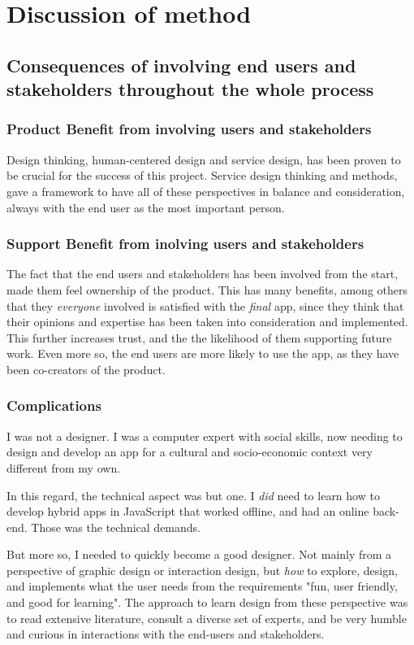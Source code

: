 \section{Discussion of method}

\subsection{Consequences of involving end users and stakeholders throughout the whole process}

\subsubsection{Product Benefit from involving users and stakeholders}
Design thinking, human-centered design and service design, has been proven to be crucial for the success of this project. Service design thinking and methods, gave a framework to have all of these perspectives in balance and consideration, always with the end user as the most important person.

\subsubsection{Support Benefit from inolving users and stakeholders}
The fact that the end users and stakeholders has been involved from the start, made them feel ownership of the product. This has many benefits, among others that they \textit{everyone} involved is satisfied with the \textit{final} app, since they think that their opinions and expertise has been taken into consideration and implemented. This further increases trust, and the the likelihood of them supporting future work. Even more so, the end users are more likely to use the app, as they have been co-creators of the product.

\subsubsection{Complications}
I was not a designer. I was a computer expert with social skills, now needing to design and develop an app for a cultural and socio-economic context very different from my own.

In this regard, the technical aspect was but one. I \textit{did} need to learn how to develop hybrid apps in JavaScript that worked offline, and had an online back-end. Those was the technical demands.

But more so, I needed to quickly become a good designer. Not mainly from a perspective of graphic design or interaction design, but \textit{how} to explore, design, and implements what the user needs from the requirements "fun, user friendly, and good for learning". The approach to learn design from these perspective was to read extensive literature, consult a diverse set of experts, and be very humble and curious in interactions with the end-users and stakeholders.

